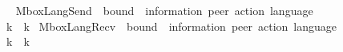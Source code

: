 \begin{isabellebody}
\ \ {\isachardoublequoteopen}{\isasymL}\isactrlsub {\isasyminfinity}\ {\isasymequiv}\ {\isasymL}\isactrlbsub {\isasyminfinity}\isactrlesub {\isachardoublequoteclose}\isanewline
\isanewline
{}\isamarkupfalse%
\ MboxLangSend\ {\isacharcolon}{\kern0pt}{\isacharcolon}{\kern0pt}\ {\isachardoublequoteopen}bound\ {\isasymRightarrow}\ {\isacharparenleft}{\kern0pt}{\isacharprime}{\kern0pt}information{\isacharcomma}{\kern0pt}\ {\isacharprime}{\kern0pt}peer{\isacharparenright}{\kern0pt}\ action\ language{\isachardoublequoteclose}\ \ {\isacharparenleft}{\kern0pt}{\isachardoublequoteopen}{\isasymL}\isactrlsub {\isacharbang}{\kern0pt}\isactrlbsub {\isacharunderscore}{\kern0pt}\isactrlesub {\isachardoublequoteclose}\ {\isacharbrackleft}{\kern0pt}{}{}{}{\isacharbrackright}{\kern0pt}\ {}{}{}{\isacharparenright}{\kern0pt}\isanewline
\ \ \isanewline
\ \ \ \ {\isachardoublequoteopen}{\isasymL}\isactrlsub {\isacharbang}{\kern0pt}\isactrlbsub k\isactrlesub \ {\isasymequiv}\ {\isacharparenleft}{\kern0pt}{\isasymL}\isactrlbsub k\isactrlesub {\isacharparenright}{\kern0pt}{\isasymdownharpoonright}\isactrlsub {\isacharbang}{\kern0pt}{\isachardoublequoteclose}\isanewline
\isanewline
{}\isamarkupfalse%
\ MboxLangRecv\ {\isacharcolon}{\kern0pt}{\isacharcolon}{\kern0pt}\ {\isachardoublequoteopen}bound\ {\isasymRightarrow}\ {\isacharparenleft}{\kern0pt}{\isacharprime}{\kern0pt}information{\isacharcomma}{\kern0pt}\ {\isacharprime}{\kern0pt}peer{\isacharparenright}{\kern0pt}\ action\ language{\isachardoublequoteclose}\ \ {\isacharparenleft}{\kern0pt}{\isachardoublequoteopen}{\isasymL}\isactrlsub {\isacharquery}{\kern0pt}\isactrlbsub {\isacharunderscore}{\kern0pt}\isactrlesub {\isachardoublequoteclose}\ {\isacharbrackleft}{\kern0pt}{}{}{}{\isacharbrackright}{\kern0pt}\ {}{}{}{\isacharparenright}{\kern0pt}\isanewline
\ \ \isanewline
\ \ \ \ {\isachardoublequoteopen}{\isasymL}\isactrlsub {\isacharquery}{\kern0pt}\isactrlbsub k\isactrlesub \ {\isasymequiv}\ {\isacharparenleft}{\kern0pt}{\isasymL}\isactrlbsub k\isactrlesub {\isacharparenright}{\kern0pt}{\isasymdownharpoonright}\isactrlsub {\isacharquery}{\kern0pt}{\isachardoublequoteclose}%
\isadelimdocument
%
\endisadelimdocument
%
\isatagdocument
%
\isamarkuptrue%
%
\endisatagdocument
{\isafolddocument}%
%
\isadelimdocument
%
\endisadelimdocument
{}\isamarkupfalse%

\end{isabellebody}
